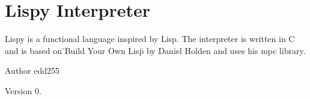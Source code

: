 \chapter{Lispy Interpreter}
\hypertarget{index}{}\label{index}
Lispy is a functional language inspired by Lisp. The interpreter is written in C and is based on \"{}\+Build Your Own Lisp\"{} by Daniel Holden and uses his mpc library.

\begin{DoxyAuthor}{Author}
edd255 
\end{DoxyAuthor}
\begin{DoxyVersion}{Version}
0. 
\end{DoxyVersion}

